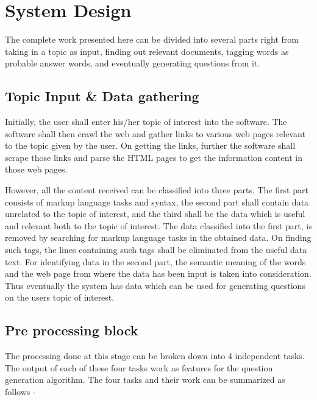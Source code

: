 \chapter{System Design}

The complete work presented here can be divided into several parts right from
taking in a topic as input, finding out relevant documents, tagging words as
probable answer words, and eventually generating questions from it. 


\section{Topic Input \& Data gathering}

Initially, the user shall enter his/her topic of interest into the software. The
software shall then crawl the web and gather links to various web pages relevant
to the topic given by the user. On getting the links, further the software shall
scrape those links and parse the HTML pages to get the information content in
those web pages.  

However, all the content received can be classified into three parts. The first
part consists of markup language tasks and syntax, the second part shall contain
data unrelated to the topic of interest, and the third shall be the data which
is useful and relevant both to the topic of interest. The data classified into
the first part, is removed by searching for markup language tasks in the
obtained data.  On finding such tags, the lines containing such tags shall be
eliminated from the useful data text. For identifying data in the second part,
the semantic meaning of the words and the web page from where the data has been
input is taken into consideration. Thus eventually the system has data which can
be used for generating questions on the users topic of interest.


\section{Pre processing block}

The processing done at this stage can be broken down into 4 independent tasks.
The output of each of these four tasks work as features for the question
generation algorithm. The four tasks and their work can be summarized as follows
-

